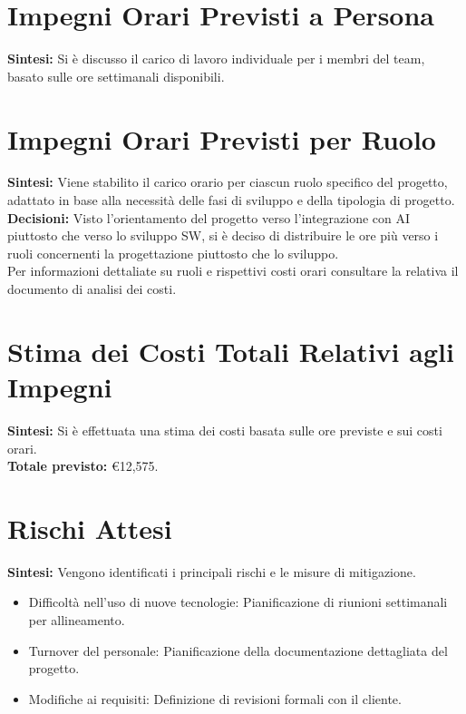 \documentclass{article}
\begin{document}
\section{Impegni Orari Previsti a Persona}
\textbf{Sintesi:} Si è discusso il carico di lavoro individuale per i membri del team, basato sulle ore settimanali disponibili.

\section{Impegni Orari Previsti per Ruolo}
\textbf{Sintesi:} Viene stabilito il carico orario per ciascun ruolo specifico del progetto, adattato in base alla necessità delle fasi di sviluppo e della tipologia di progetto. \\
\textbf{Decisioni:} Visto l'orientamento del progetto verso l'integrazione con AI piuttosto che verso lo sviluppo SW, si è deciso di distribuire le ore più verso i ruoli concernenti la progettazione piuttosto che lo sviluppo.\\Per informazioni dettaliate su ruoli e rispettivi costi orari consultare la relativa il documento di analisi dei costi.

\section{Stima dei Costi Totali Relativi agli Impegni}
\textbf{Sintesi:} Si è effettuata una stima dei costi basata sulle ore previste e sui costi orari. \\
\textbf{Totale previsto:} €12,575. 

\section{Rischi Attesi}
\textbf{Sintesi:} Vengono identificati i principali rischi e le misure di mitigazione.
\begin{itemize}
    \item Difficoltà nell'uso di nuove tecnologie: Pianificazione di riunioni settimanali per allineamento.
    \item Turnover del personale: Pianificazione della documentazione dettagliata del progetto.
    \item Modifiche ai requisiti: Definizione di revisioni formali con il cliente.
\end{itemize}
\end{document}
